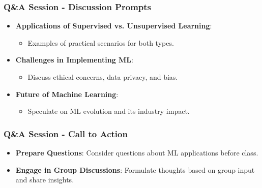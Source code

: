 \documentclass[aspectratio=169]{beamer}
\begin{document}
\begin{frame}[fragile]
    \frametitle{Q\&A Session - Discussion Prompts}
    \begin{itemize}
        \item \textbf{Applications of Supervised vs. Unsupervised Learning}:
            \begin{itemize}
                \item Examples of practical scenarios for both types.
            \end{itemize}
        \item \textbf{Challenges in Implementing ML}:
            \begin{itemize}
                \item Discuss ethical concerns, data privacy, and bias.
            \end{itemize}
        \item \textbf{Future of Machine Learning}:
            \begin{itemize}
                \item Speculate on ML evolution and its industry impact.
            \end{itemize}
    \end{itemize}
\end{frame}

\begin{frame}[fragile]
    \frametitle{Q\&A Session - Call to Action}
    \begin{itemize}
        \item \textbf{Prepare Questions}: Consider questions about ML applications before class.
        \item \textbf{Engage in Group Discussions}: Formulate thoughts based on group input and share insights.
    \end{itemize}
\end{frame}
\end{document}
